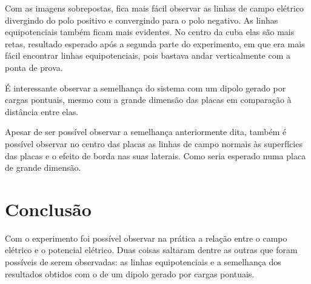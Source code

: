 \documentclass[
12pt,				%
oneside,			%
a4paper,			%
english,			%
french,				%
spanish,			%
brazil				%
]{abntex2}
\begin{document}
Com as imagens sobrepostas, fica mais fácil observar as linhas de campo elétrico divergindo do polo positivo e convergindo para o polo negativo. As linhas equipotenciais também ficam mais evidentes. No centro da cuba elas são mais retas, resultado esperado após a segunda parte do experimento, em que era mais fácil encontrar linhas equipotenciais, pois bastava andar verticalmente com a ponta de prova.

É interessante observar a semelhança do sistema com um dipolo gerado por cargas pontuais, mesmo com a grande dimensão das placas em comparação à distância entre elas.

Apesar de ser possível observar a semelhança anteriormente dita, também é possível observar no centro das placas as linhas de campo normais às superfícies das placas e o efeito de borda nas suas laterais. Como seria esperado numa placa de grande dimensão.

\chapter{Conclusão}

Com o experimento foi possível observar na prática a relação entre o campo elétrico e o potencial elétrico.
Duas coisas saltaram dentre as outras que foram possíveis de serem observadas: as linhas equipotenciais e a semelhança dos resultados obtidos com o de um dipolo gerado por cargas pontuais.

\postextual


%
%
\end{document}

